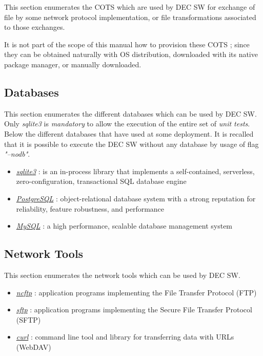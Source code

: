 \documentclass[dec_sum_main.tex]{subfiles}
\begin{document}
This section enumerates the COTS which are used by DEC SW for exchange of file by some network protocol implementation, or file transformations associated to those exchanges.
\par
\noindent
It is not part of the scope of this manual how to provision these COTS ; since they can be obtained naturally with OS distribution, downloaded with its native package manager, or manually downloaded. 

\subsection{Databases}
This section enumerates the different databases which can be used by DEC SW. Only \textit{sqlite3} is \textit{mandatory} to allow the execution of the entire set of \textit{unit tests}. Below the different databases that have used at some deployment. It is recalled that it is possible to execute the DEC SW without any database by usage of flag \textit{"--nodb"}.
\par
\begin{itemize}
	\item \href{https://www.sqlite.org}{\textit{sqlite3}} : is an in-process library that implements a self-contained, serverless, zero-configuration, transactional SQL database engine
	\item \href{https://www.postgresql.org/}{\textit{PostgreSQL}} : object-relational database system with a strong reputation for reliability, feature robustness, and performance
	\item \href{https://www.mysql.com/}{\textit{MySQL}} : a high performance, scalable database management system
\end{itemize}

\subsection{Network Tools}
This section enumerates the network tools which can be used by DEC SW.
\par
\begin{itemize}
	\item \href{https://www.ncftp.com}{\textit{ncftp}} : application programs implementing the File Transfer Protocol (FTP)
	\item \href{https://www.openssh.com}{\textit{sftp}} : application programs implementing the Secure File Transfer Protocol (SFTP)
	\item \href{https://curl.haxx.se}{\textit{curl}} : command line tool and library for transferring data with URLs (WebDAV)
\end{itemize}
\end{document}
